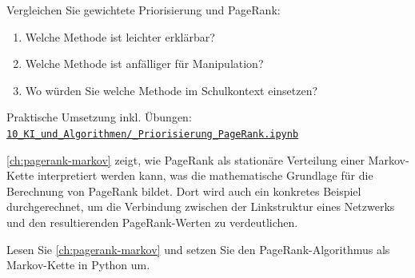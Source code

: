 \begin{mychallenge}
    Vergleichen Sie gewichtete Priorisierung und PageRank:
    \begin{enumerate}
        \item Welche Methode ist leichter erklärbar?
        \item Welche Methode ist anfälliger für Manipulation?
        \item Wo würden Sie welche Methode im Schulkontext einsetzen?
    \end{enumerate}
\end{mychallenge}

\begin{myremark}[Notebook]
    Praktische Umsetzung inkl. Übungen:\newline
    \href{\notebookurl}{\texttt{10\_KI\_und\_Algorithmen/\_Priorisierung\_PageRank.ipynb}}
\end{myremark}

\cref{ch:pagerank-markov} zeigt, wie PageRank als stationäre Verteilung einer Markov-Kette interpretiert werden kann, was die mathematische Grundlage für die Berechnung von PageRank bildet. Dort wird auch ein konkretes Beispiel durchgerechnet, um die Verbindung zwischen der Linkstruktur eines Netzwerks und den resultierenden PageRank-Werten zu verdeutlichen.

\begin{mychallenge}
Lesen Sie \cref{ch:pagerank-markov} und setzen Sie den PageRank-Algorithmus als Markov-Kette in Python um.
\end{mychallenge}
